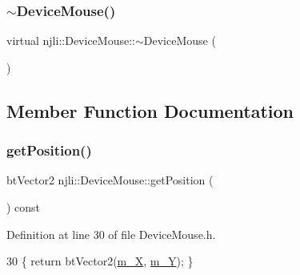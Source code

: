 \mbox{\label{classnjli_1_1_device_mouse_a627f38bca78b41bb6b62fd7f3577a0e9}} 
\subsubsection{\texorpdfstring{$\sim$\+Device\+Mouse()}{~DeviceMouse()}}
{\footnotesize\ttfamily virtual njli\+::\+Device\+Mouse\+::$\sim$\+Device\+Mouse (\begin{DoxyParamCaption}{ }\end{DoxyParamCaption})\hspace{0.3cm}{\ttfamily [virtual]}}



\subsection{Member Function Documentation}
\mbox{\label{classnjli_1_1_device_mouse_acb280f0e78e60d2c6c449d09696c5365}} 
\subsubsection{\texorpdfstring{get\+Position()}{getPosition()}}
{\footnotesize\ttfamily bt\+Vector2 njli\+::\+Device\+Mouse\+::get\+Position (\begin{DoxyParamCaption}{ }\end{DoxyParamCaption}) const\hspace{0.3cm}{\ttfamily [inline]}}



Definition at line 30 of file Device\+Mouse.\+h.


\begin{DoxyCode}
30 \{ \textcolor{keywordflow}{return} btVector2(\mbox{\hyperlink{classnjli_1_1_device_mouse_ad62299ae082d8a421bfbcc0934d4512c}{m\_X}}, \mbox{\hyperlink{classnjli_1_1_device_mouse_a565bc5cfae357af3e49c616c8ea21c82}{m\_Y}}); \}
\end{DoxyCode}
\mbox{\label{classnjli_1_1_device_mouse_acfb2479b7c88042d6fb5ce58b4482264}} 
